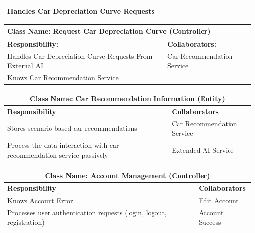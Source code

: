 \documentclass[]{article}
\begin{document}
\begin{itemize}
\begin{table}[H]
\begin{tabular}{|p{6cm}|p{6cm}|}
                Handles Car Depreciation Curve Requests &  \\
                \hline
            \end{tabular}
        \end{table}
        \begin{table}[H]
            \centering
            \begin{tabular}{|p{6cm}|p{6cm}|}
                \hline 
                \multicolumn{2}{|l|}{\textbf{Class Name: Request Car Depreciation Curve (Controller)}} \\
                \hline
                \textbf{Responsibility:} & \textbf{Collaborators:} \\
                \hline
                Handles Car Depreciation Curve Requests From External AI & Car Recommendation Service \\
                Knows Car Recommendation Service & \\
                \hline
            \end{tabular}
        \end{table}
        \begin{table}[H]
            \centering
            \begin{tabular}{|p{6cm}|p{6cm}|}
            \hline 
             \multicolumn{2}{|c|}{\textbf{Class Name: Car Recommendation Information (Entity)}} \\
            \hline
            \textbf{Responsibility} & \textbf{Collaborators} \\
            \hline
            Stores scenario-based car recommendations & Car Recommendation Service \\
            Process the data interaction with car recommendation service passively & Extended AI Service\\
            \hline
            \end{tabular}
        \end{table}
        \begin{table}[H]
            \centering
            \begin{tabular}{|p{6cm}|p{6cm}|}
            \hline 
             \multicolumn{2}{|c|}{\textbf{Class Name: Account Management (Controller)}} \\
            \hline
            \textbf{Responsibility} & \textbf{Collaborators} \\
            \hline
            Knows Account Error & Edit Account\\
            Processes user authentication requests (login, logout, registration) & Account Success\\

\end{tabular}
\end{table}
\end{itemize}
\end{document}
